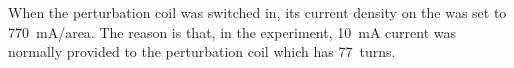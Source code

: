 

When the perturbation coil was switched in, its current density on the
was set to 770~mA/area.  The reason is that, in the experiment, 10~mA
current was normally provided to the perturbation coil which has
77~turns.




